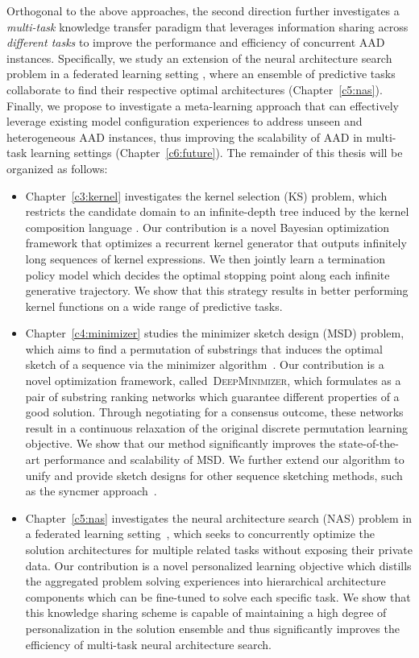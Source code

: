 Orthogonal to the above approaches, the second direction further investigates a \emph{multi-task} knowledge transfer paradigm that leverages information sharing across \emph{different tasks} to improve the performance and efficiency of concurrent AAD instances. Specifically, we study an extension of the neural architecture search problem in a federated learning setting \cite{McMahan17}, where an ensemble of predictive tasks collaborate to find their respective optimal architectures (Chapter~\ref{c5:nas}). Finally, we propose to investigate a meta-learning approach \cite{Finn17} that can effectively leverage existing model configuration experiences to address unseen and heterogeneous AAD instances, thus improving the scalability of AAD in multi-task learning settings (Chapter~\ref{c6:future}). The remainder of this thesis will be organized as follows:
\begin{itemize}
    \item Chapter~\ref{c3:kernel} investigates the kernel selection (KS) problem, which restricts the candidate domain to an infinite-depth tree induced by the kernel composition language \cite{Duvenaud13}. Our contribution is a novel Bayesian optimization framework that optimizes a recurrent kernel generator that outputs infinitely long sequences of kernel expressions. We then jointly learn a termination policy model which decides the optimal stopping point along each infinite generative trajectory. We show that this strategy results in better performing kernel functions on a wide range of predictive tasks.
    
    \item Chapter~\ref{c4:minimizer} studies the minimizer sketch design (MSD) problem, which aims to find a permutation of substrings that induces the optimal sketch of a sequence via the minimizer algorithm~\cite{schleimer03,marcais17}. Our contribution is a novel optimization framework, called~\textsc{DeepMinimizer}, which formulates as a pair of substring ranking networks which guarantee different properties of a good solution. Through negotiating for a consensus outcome, these networks result in a continuous relaxation of the original discrete permutation learning objective. We show that our method significantly improves the state-of-the-art performance and scalability of MSD. We further extend our algorithm to unify and provide sketch designs for other sequence sketching methods, such as the syncmer approach~\cite{edgar2021syncmers,shaw2021theory}.
    
    \item Chapter~\ref{c5:nas} investigates the neural architecture search (NAS) problem in a federated learning setting~\cite{McMahan17}, which seeks to concurrently optimize the solution architectures for multiple related tasks without exposing their private data. Our contribution is a novel personalized learning objective which distills the aggregated problem solving experiences into hierarchical architecture components which can be fine-tuned to solve each specific task. We show that this knowledge sharing scheme is capable of maintaining a high degree of personalization in the solution ensemble and thus significantly improves the efficiency of multi-task neural architecture search.


\end{itemize}

